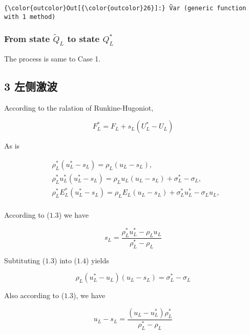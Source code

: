 \documentclass[11pt]{article}
\begin{document}
\begin{Verbatim}[commandchars=\\\{\}]
{\color{outcolor}Out[{\color{outcolor}26}]:} Ṽar (generic function with 1 method)
\end{Verbatim}
            
    \subsubsection{\texorpdfstring{From state \(\widetilde{Q}_L\) to state
\(Q_L^*\)}{From state \textbackslash{}widetilde\{Q\}\_L to state Q\_L\^{}*}}\label{from-state-widetildequx5fl-to-state-qux5fl}

The process is same to Case 1.

    \subsection{3 左侧激波}\label{ux5de6ux4fa7ux6fc0ux6ce2}

 According to the ralation of Runkine-Hugoniot,

\begin{equation} \tag{1.2}
F_L^*=F_L+s_L(U_L^*-U_L)
  \end{equation}

    As is

\begin{align}
    &\rho^*_L(u^*_L-s_L) = \rho_L(u_L-s_L), \tag{1.3}\\
    &\rho^*_Lu^*_L(u^*_L-s_L) = \rho_Lu_L(u_L-s_L)+\sigma^*_L-\sigma_L,  \tag{1.4}\\
    &\rho^*_LE^*_L(u^*_L-s_L) = \rho_LE_L(u_L-s_L)+\sigma^*_L u^*_L-\sigma_Lu_L, \tag{1.5}\\
\end{align}

    According to (\(1.3\)) we have

\begin{equation}\tag{1.6}
s_L = \frac{\rho_L^* u_L^* - \rho_L u_L}{\rho_L^*-\rho_L}
\end{equation}

    Subtituting (\(1.3\)) into (\(1.4\)) yields

\begin{equation}\tag{1.7}
\rho_L(u^*_L-u_L)(u_L-s_L) = \sigma_L^*-\sigma_L
\end{equation}

    Also according to (\(1.3\)), we have

\begin{equation}
u_L-s_L = \frac{(u_L - u_L^*)\rho_L^*}{\rho_L^* -\rho_L}
\end{equation}
\end{document}
